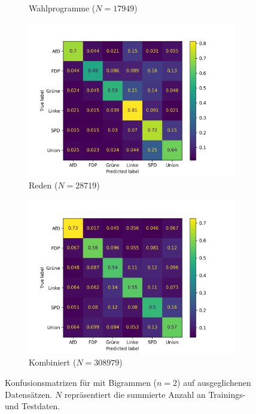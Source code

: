 \begin{figure}[H]
\begin{subfigure}{0.49\textwidth}
      \caption{Wahlprogramme (\(N = \num{17949}\))} \label{sfig:confusionMatrixFastTextManifestBalanced}
    \end{subfigure}
    \hfill
    \begin{subfigure}{0.49\textwidth}
      \includegraphics[width=\textwidth]{data/images/modeling/fasttext/under/speeches_confusion_matrix.png}
      \caption{Reden (\(N = \num{28719}\))} \label{sfig:confusionMatrixFastTextSpeechesBalanced}
    \end{subfigure}
    \hfill
    \begin{subfigure}{0.49\textwidth}
      \includegraphics[width=\textwidth]{data/images/modeling/fasttext/under/all_confusion_matrix.png}
      \caption{Kombiniert (\(N = \num{308979}\))} \label{sfig:confusionMatrixFastTextAllBalanced}
    \end{subfigure}
    \caption[Konfusionsmatrizen für \ft mit Bigrammen (\(n = \num{2}\)) auf ausgeglichenen Datensätzen]{Konfusionsmatrizen für \ft mit Bigrammen (\(n = \num{2}\)) auf ausgeglichenen Datensätzen. \(N\) repräsentiert die summierte Anzahl an Trainings- und Testdaten.} \label{fig:balancedConfusionMatrixFastText}
\end{figure}

